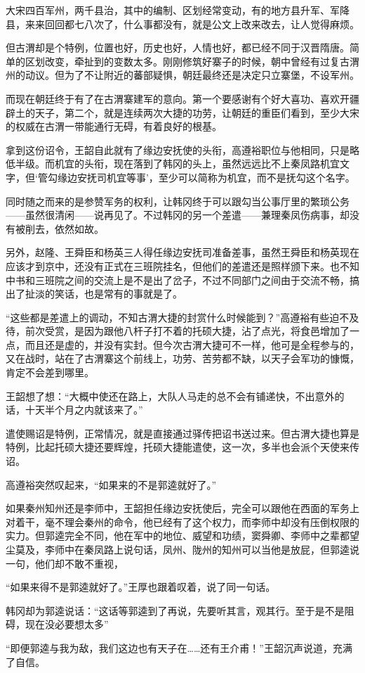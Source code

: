 大宋四百军州，两千县治，其中的编制、区划经常变动，有的地方县升军、军降县，来来回回都七八次了，什么事都没有，就是公文上改来改去，让人觉得麻烦。

但古渭却是个特例，位置也好，历史也好，人情也好，都已经不同于汉晋隋唐。简单的区划改变，牵扯到的变数太多。刚刚修筑好寨子的时候，朝中曾经有过复古渭州的动议。但为了不让附近的蕃部疑惧，朝廷最终还是决定只立寨堡，不设军州。

而现在朝廷终于有了在古渭寨建军的意向。第一个要感谢有个好大喜功、喜欢开疆辟土的天子，第二个，就是连续两次大捷的功劳，让朝廷的重臣们看到，至少大宋的权威在古渭一带能通行无碍，有着良好的根基。

拿到这份诏令，王韶自此就有了缘边安抚使的头衔，高遵裕职位与他相同，只是略低半级。而机宜的头衔，现在落到了韩冈的头上，虽然远远比不上秦凤路机宜文字，但‘管勾缘边安抚司机宜等事’，至少可以简称为机宜，而不是抚勾这个名字。

同时随之而来的是参赞军务的权利，让韩冈终于可以跟勾当公事厅里的繁琐公务——虽然很清闲——说再见了。不过韩冈的另一个差遣——兼理秦凤伤病事，却没有被削去，依然如故。

另外，赵隆、王舜臣和杨英三人得任缘边安抚司准备差事，虽然王舜臣和杨英现在应该才到京中，还没有正式在三班院挂名，但他们的差遣还是照样颁下来。也不知中书和三班院之间的交流上是不是出了岔子，不过不同部门之间由于交流不畅，搞出了扯淡的笑话，也是常有的事就是了。

“这些都是差遣上的调动，不知古渭大捷的封赏什么时候能到？”高遵裕有些迫不及待，前次受赏，是因为跟他八杆子打不着的托硕大捷，沾了点光，将食邑增加了一点，而且还是虚的，并没有实封。但今次古渭大捷可不一样，他可是全程参与的，又在战时，站在了古渭寨这个前线上，功劳、苦劳都不缺，以天子会军功的慷慨，肯定不会差到哪里。

王韶想了想：“大概中使还在路上，大队人马走的总不会有铺递快，不出意外的话，十天半个月之内就该来了。”

遣使赐诏是特例，正常情况，就是直接通过驿传把诏书送过来。但古渭大捷也算是特例，比起托硕大捷还要辉煌，托硕大捷能遣使，这一次，多半也会派个天使来传诏。

高遵裕突然叹起来，“如果来的不是郭逵就好了。”

如果秦州知州还是李师中，王韶担任缘边安抚使后，完全可以跟他在西面的军务上对着干，毫不理会秦州的命令，他已经有了这个权力，而李师中却没有压倒权限的实力。但郭逵完全不同，他在军中的地位、威望和功绩，窦舜卿、李师中之辈都望尘莫及，李师中在秦凤路上说句话，凤州、陇州的知州可以当他是放屁，但郭逵说一句，他们却不敢不重视，

“如果来得不是郭逵就好了。”王厚也跟着叹着，说了同一句话。

韩冈却为郭逵说话：“这话等郭逵到了再说，先要听其言，观其行。至于是不是阻碍，现在没必要想太多”

“即便郭逵与我为敌，我们这边也有天子在……还有王介甫！”王韶沉声说道，充满了自信。

